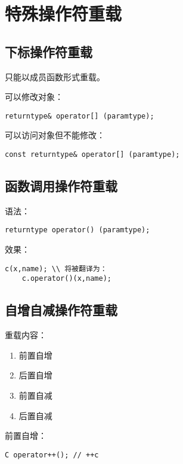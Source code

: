 \newpage

\section{特殊操作符重载}

\subsection{下标操作符重载}

只能以成员函数形式重载。

可以修改对象：
\begin{lstlisting}[frame=shadowbox]
    returntype& operator[] (paramtype);
\end{lstlisting}

可以访问对象但不能修改：
\begin{lstlisting}[frame=shadowbox]
    const returntype& operator[] (paramtype);
\end{lstlisting}

\subsection{函数调用操作符重载}

语法：
\begin{lstlisting}[frame=shadowbox]
    returntype operator() (paramtype);
\end{lstlisting}

效果：
\begin{lstlisting}[frame=shadowbox]
    c(x,name); \\ 将被翻译为：
    c.operator()(x,name);
\end{lstlisting}

\subsection{自增自减操作符重载}

重载内容：
\begin{enumerate}
    \item 前置自增
    \item 后置自增
    \item 前置自减
    \item 后置自减
\end{enumerate}

前置自增：
\begin{lstlisting}[frame=shadowbox]
    C operator++(); // ++c
\end{lstlisting}

